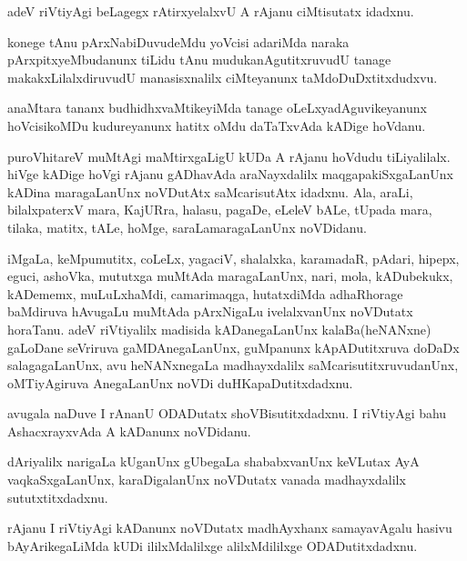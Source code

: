 \documentclass{article}
\begin{document}
\begin{mn}%
adeV riVtiyAgi beLagegx rAtirxyelalxvU A rAjanu ciMtisutatx idadxnu.
\end{mn}

\begin{mn}%
konege tAnu pArxNabiDuvudeMdu yoVcisi adariMda naraka pArxpitxyeMbudanunx tiLidu tAnu 
mudukanAgutitxruvudU tanage makakxLilalxdiruvudU manasisxnalilx ciMteyanunx taMdoDuDxtitxdudxvu.
\end{mn}

\begin{mn}%
anaMtara tananx budhidhxvaMtikeyiMda tanage oLeLxyadAguvikeyanunx hoVcisikoMDu kudureyanunx hatitx 
oMdu daTaTxvAda kADige hoVdanu.
\end{mn}

\begin{mn}%
puroVhitareV muMtAgi maMtirxgaLigU kUDa A rAjanu hoVdudu tiLiyalilalx. hiVge kADige hoVgi rAjanu 
gADhavAda araNayxdalilx maqgapakiSxgaLanUnx kADina maragaLanUnx noVDutAtx saMcarisutAtx idadxnu. 
Ala, araLi, bilalxpaterxV mara, KajURra, halasu, pagaDe, eLeleV bALe, tUpada mara, tilaka, matitx, 
tALe, hoMge, saraLamaragaLanUnx noVDidanu.
\end{mn}

\begin{mn}%
iMgaLa, keMpumutitx, coLeLx, yagaciV, shalalxka, karamadaR, pAdari, hipepx, eguci, ashoVka, 
mututxga muMtAda maragaLanUnx, nari, mola, kADubekukx, kADememx, muLuLxhaMdi, camarimaqga, 
hutatxdiMda adhaRhorage baMdiruva hAvugaLu muMtAda pArxNigaLu ivelalxvanUnx noVDutatx horaTanu. 
adeV riVtiyalilx madisida kADanegaLanUnx kalaBa(heNANxne) gaLoDane seVriruva gaMDAnegaLanUnx, 
guMpanunx kApADutitxruva doDaDx salagagaLanUnx, avu heNANxnegaLa madhayxdalilx 
saMcarisutitxruvudanUnx, oMTiyAgiruva AnegaLanUnx noVDi duHKapaDutitxdadxnu.
\end{mn}

\begin{mn}%
avugala naDuve I rAnanU ODADutatx shoVBisutitxdadxnu. I riVtiyAgi bahu AshacxrayxvAda A kADanunx 
noVDidanu.
\end{mn}

\begin{mn}%
dAriyalilx narigaLa kUganUnx gUbegaLa shababxvanUnx keVLutax AyA vaqkaSxgaLanUnx, karaDigalanUnx 
noVDutatx vanada madhayxdalilx sututxtitxdadxnu.
\end{mn}

\begin{mn}%
rAjanu I riVtiyAgi kADanunx noVDutatx madhAyxhanx samayavAgalu hasivu bAyArikegaLiMda kUDi 
ililxMdalilxge alilxMdililxge ODADutitxdadxnu.
\end{mn}
\end{document}
